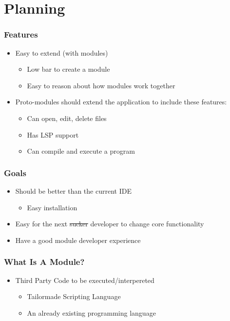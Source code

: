 \section{Planning}
\SectionPage

\begin{frame}
  \frametitle{Features}
  \begin{itemize}
    \item Easy to extend (with modules)
      \begin{itemize}
        \item Low bar to create a module
        \item Easy to reason about how modules work together
      \end{itemize}
    \item Proto-modules should extend the application to include these features:
      \begin{itemize}
        \item Can open, edit, delete files
        \item Has LSP support
        \item Can compile and execute a program
      \end{itemize}
  \end{itemize}
\end{frame}

\begin{frame}
  \frametitle{Goals}
  \begin{itemize}
    \item Should be better than the current IDE
      \begin{itemize}
        \item Easy installation
      \end{itemize}
    \item Easy for the next \sout{sucker} developer to change core functionality
    \item Have a good module developer experience
  \end{itemize}
\end{frame}

\begin{frame}
  \frametitle{What Is A Module?}
  \begin{itemize}
    \item Third Party Code to be executed/interpereted
      \begin{itemize}
        \item Tailormade Scripting Language
        \item An already existing programming language
      \end{itemize}
  \end{itemize}
\end{frame}

